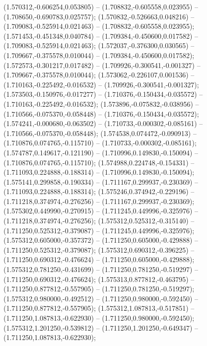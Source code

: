  (1.570312,-0.606254,0.053805) -- (1.708832,-0.605558,0.023955) -- (1.708650,-0.690783,0.025757);
 (1.570832,-0.526663,0.048216) -- (1.709083,-0.525914,0.021463) -- (1.708832,-0.605558,0.023955);
 (1.571453,-0.451348,0.040784) -- (1.709384,-0.450600,0.017582) -- (1.709083,-0.525914,0.021463);
 (1.572037,-0.376300,0.030565) -- (1.709667,-0.375578,0.010044) -- (1.709384,-0.450600,0.017582);
 (1.572573,-0.301217,0.017482) -- (1.709926,-0.300541,-0.001327) -- (1.709667,-0.375578,0.010044);
 (1.573062,-0.226107,0.001536) -- (1.710163,-0.225492,-0.016532) -- (1.709926,-0.300541,-0.001327);
 (1.573503,-0.150976,-0.017277) -- (1.710376,-0.150434,-0.035572) -- (1.710163,-0.225492,-0.016532);
 (1.573896,-0.075832,-0.038956) -- (1.710566,-0.075370,-0.058448) -- (1.710376,-0.150434,-0.035572);
 (1.574241,-0.000680,-0.063502) -- (1.710733,-0.000302,-0.085161) -- (1.710566,-0.075370,-0.058448);
 (1.574538,0.074472,-0.090913) -- (1.710876,0.074765,-0.115710) -- (1.710733,-0.000302,-0.085161);
 (1.574787,0.149617,-0.121190) -- (1.710996,0.149830,-0.150094) -- (1.710876,0.074765,-0.115710);
 (1.574988,0.224748,-0.154331) -- (1.711093,0.224888,-0.188314) -- (1.710996,0.149830,-0.150094);
 (1.575141,0.299858,-0.190334) -- (1.711167,0.299937,-0.230369) -- (1.711093,0.224888,-0.188314);
 (1.575246,0.374942,-0.229196) -- (1.711218,0.374974,-0.276256) -- (1.711167,0.299937,-0.230369);
 (1.575302,0.449990,-0.270915) -- (1.711245,0.449996,-0.325976) -- (1.711218,0.374974,-0.276256);
 (1.575312,0.525312,-0.315140) -- (1.711250,0.525312,-0.379087) -- (1.711245,0.449996,-0.325976);
 (1.575312,0.605000,-0.357372) -- (1.711250,0.605000,-0.429888) -- (1.711250,0.525312,-0.379087);
 (1.575312,0.690312,-0.396225) -- (1.711250,0.690312,-0.476624) -- (1.711250,0.605000,-0.429888);
 (1.575312,0.781250,-0.431699) -- (1.711250,0.781250,-0.519297) -- (1.711250,0.690312,-0.476624);
 (1.575313,0.877812,-0.463795) -- (1.711250,0.877812,-0.557905) -- (1.711250,0.781250,-0.519297);
 (1.575312,0.980000,-0.492512) -- (1.711250,0.980000,-0.592450) -- (1.711250,0.877812,-0.557905);
 (1.575312,1.087813,-0.517851) -- (1.711250,1.087813,-0.622930) -- (1.711250,0.980000,-0.592450);
 (1.575312,1.201250,-0.539812) -- (1.711250,1.201250,-0.649347) -- (1.711250,1.087813,-0.622930);
